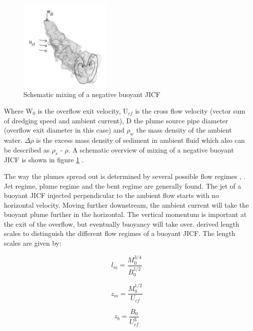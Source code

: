 \begin{figure}[ht!]
  \centering
    \includegraphics[width=0.4\textwidth]{Images/Jet_mixing.png}
  \caption{Schematic mixing of a negative buoyant JICF }
  \label{fig:Jetmixing}
\end{figure} 

\noindent Where W$_0$ is the overflow exit velocity, U$_{cf}$ is the cross flow velocity (vector sum of dredging speed and ambient current), D the plume source pipe diameter (overflow exit diameter in this case) and $\rho_w$ the mass density of the ambient water. $\Delta \rho$ is the excess mass density of sediment in ambient fluid which also can be described as $\rho_s$ - $\rho$. A schematic overview of mixing of a negative buoyant JICF is shown in figure \ref{fig:Jetmixing} \citep{Dewit}. \newline

\newpage
\noindent The way the plumes spread out is determined by several possible flow regimes \citep{Wright}, \citep{Fischer+}. Jet regime, plume regime and the bent regime are generally found. The jet of a buoyant JICF injected perpendicular to the ambient flow starts with no horizontal velocity. Moving further downstream, the ambient current will take the buoyant plume further in the horizontal. The vertical momentum is important at the exit of the overflow, but eventually buoyancy will take over. \cite{Fischer+} derived length scales to distinguish the different flow regimes of a buoyant JICF. The length scales are given by:

\begin{equation}
\label{eq:lm}
 l_m = \frac{M_0^{3/4}}{B_{0}^{1/2}}
\end{equation}

\begin{equation}
\label{eq:zm}
 z_m = \frac{M_0^{1/2}}{U_{cf}}
\end{equation}

\begin{equation}
\label{eq:zb}
 z_b = \frac{B_0}{U_{cf}^3}
\end{equation}

